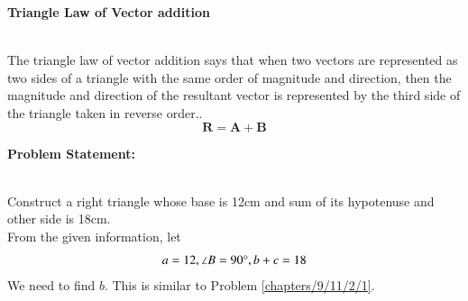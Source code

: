 \documentclass[10pt,a4paper]{report}
\let\vec\mathbf
\begin{document}
\begin{multicols}{2}

\textbf{Triangle Law of Vector addition }
\vspace{0.5cm}\raggedright \\
The triangle law of vector addition says that when two vectors are represented as two sides of a triangle with the same order of magnitude and direction, then the magnitude and direction of the resultant vector is represented by the third side of the triangle taken in reverse order..\vspace{3mm} \\ 
\begin{equation}
\vec{R}=\vec{A}+\vec{B} 
\end{equation}
\raggedright \textbf{Problem Statement:}\vspace{2mm}
\raggedright \\
\fi
	Construct a right triangle whose base is 12cm and sum of its hypotenuse and other side is 18cm.
	\\
	\solution From the given information, let 
\begin{align}
a = 12, \angle B = 90 \degree, b+c = 18
\end{align}
We need to find $b$.  This is similar to Problem 
\ref{chapters/9/11/2/1}.


\end{multicols}
\end{document}
